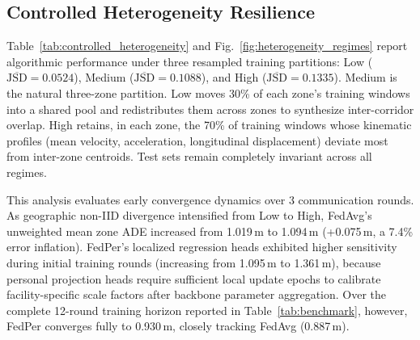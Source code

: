 \documentclass[journal]{IEEEtran}
\begin{document}
\subsection{Controlled Heterogeneity Resilience}
Table~\ref{tab:controlled_heterogeneity} and Fig.~\ref{fig:heterogeneity_regimes} report algorithmic performance under three resampled training partitions: Low ($\overline{\mathrm{JSD}} = 0.0524$), Medium ($\overline{\mathrm{JSD}} = 0.1088$), and High ($\overline{\mathrm{JSD}} = 0.1335$). Medium is the natural three-zone partition. Low moves 30\% of each zone's training windows into a shared pool and redistributes them across zones to synthesize inter-corridor overlap. High retains, in each zone, the 70\% of training windows whose kinematic profiles (mean velocity, acceleration, longitudinal displacement) deviate most from inter-zone centroids. Test sets remain completely invariant across all regimes.

This analysis evaluates early convergence dynamics over 3 communication rounds. As geographic non-IID divergence intensified from Low to High, FedAvg's unweighted mean zone ADE increased from 1.019\,m to 1.094\,m (+0.075\,m, a 7.4\% error inflation). FedPer's localized regression heads exhibited higher sensitivity during initial training rounds (increasing from 1.095\,m to 1.361\,m), because personal projection heads require sufficient local update epochs to calibrate facility-specific scale factors after backbone parameter aggregation. Over the complete 12-round training horizon reported in Table~\ref{tab:benchmark}, however, FedPer converges fully to 0.930\,m, closely tracking FedAvg (0.887\,m).

\begin{table}[!t]
\centering
\caption{Algorithmic Performance Under Resampled Geographic Non-IID Regimes (3 Communication Rounds; Unweighted Mean Zone ADE)}
\label{tab:controlled_heterogeneity}
\end{table}
\end{document}
